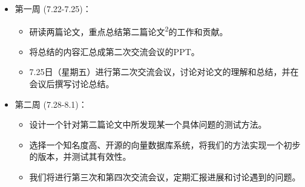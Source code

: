 \documentclass[UTF8]{ctexart}
\begin{document}
\begin{itemize}
    \item 第一周 (7.22-7.25)：
    \begin{itemize}
        \item 研读两篇论文，重点总结第二篇论文\textsuperscript{2}的工作和贡献。
        \item 将总结的内容汇总成第二次交流会议的PPT。
        \item 7.25日（星期五）进行第二次交流会议，讨论对论文的理解和总结，并在会议后撰写讨论总结。
    \end{itemize}
    \item 第二周 (7.28-8.1)：
    \begin{itemize}
        \item 设计一个针对第二篇论文中所发现某一个具体问题的测试方法。
        \item 选择一个知名度高、开源的向量数据库系统，将我们的方法实现一个初步的版本，并测试其有效性。
        \item 我们将进行第三次和第四次交流会议，定期汇报进展和讨论遇到的问题。
    \end{itemize}
\end{itemize}
\end{document}
